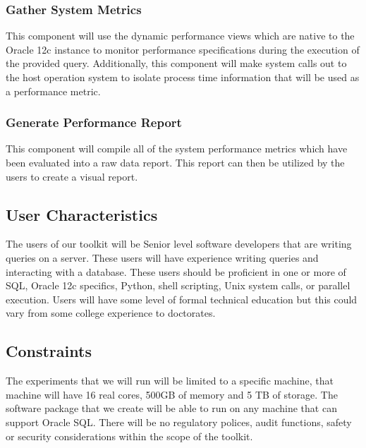 \documentclass[draftclsnofoot, onecolumn, compsoc, 10pt]{IEEEtran}
\begin{document}
\subsubsection{Gather System Metrics}
This component will use the dynamic performance views which are native to the Oracle 12c instance to monitor performance specifications during the execution of the provided query. 
Additionally, this component will make system calls out to the host operation system to isolate process time information that will be used as a performance metric. 

\subsubsection{Generate Performance Report}
This component will compile all of the system performance metrics which have been evaluated into a raw data report. This report can then be utilized by the users to create a visual report.

\subsection{User Characteristics}
The users of our toolkit will be Senior level software developers that are writing queries on a server.
These users will have experience writing queries and interacting with a database.
These users should be proficient in one or more of SQL, Oracle 12c specifics, Python, shell scripting, Unix system calls, or parallel execution.
Users will have some level of formal technical education but this could vary from some college experience to doctorates.  

\subsection{Constraints}
The experiments that we will run will be limited to a specific machine, that machine will have 16 real cores, 500GB of memory and 5 TB of storage.
The software package that we create  will be able to run on any machine that can support Oracle SQL.
There will be no regulatory polices, audit functions, safety or security considerations within the scope of the toolkit.
\end{document}
